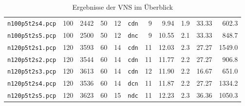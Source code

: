 \begin{table}[!htbp]
\begin{tabular}{c|rrr|r|c|rrr|r|r}
\texttt{n100p5t2s4.pcp} & 100	& 2442	& 50	& 12 & \texttt{cdn} & 9 & 9.94 & 1.9 & 33.33 & 602.3\\
\texttt{n100p5t2s5.pcp} & 100	& 2500	& 50	& 12 & \texttt{dnc} & 9 & 10.55 & 2.1 & 33.33 & 848.7\\
\texttt{n120p5t2s1.pcp} & 120	& 3593	& 60	& 14 & \texttt{cdn} & 11 & 12.03 & 2.3 & 27.27 & 1549.0\\
\texttt{n120p5t2s2.pcp} & 120	& 3544	& 60	& 14 & \texttt{cdn} & 11 & 11.77 & 2.2 & 27.27 & 906.8\\
\texttt{n120p5t2s3.pcp} & 120	& 3613	& 60	& 14 & \texttt{cdn} & 12 & 11.90 & 2.2 & 16.67 & 651.0\\
\texttt{n120p5t2s4.pcp} & 120	& 3536	& 60	& 14 & \texttt{dcn} & 11 & 11.87 & 2.2 & 27.27 & 1334.2\\
\texttt{n120p5t2s5.pcp} & 120	& 3623	& 60	& 15 & \texttt{ndc} & 11 & 12.23 & 2.3 & 36.36 & 1050.3\\
\end{tabular}
\caption{Ergebnisse der VNS im Überblick}
\label{tab:result}
\end{table}

